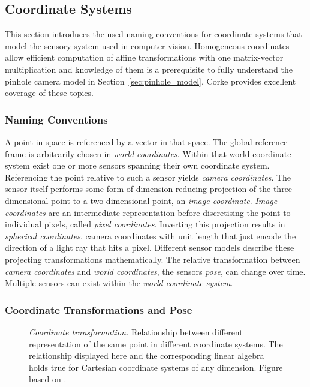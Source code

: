 \subsection{Coordinate Systems}

This section introduces the used naming conventions for coordinate systems that model the sensory system used in computer vision.
Homogeneous coordinates allow efficient computation of affine transformations with one matrix-vector multiplication and knowledge of them is a prerequisite to fully understand the pinhole camera model in Section~\ref{sec:pinhole_model}.
Corke\cite[p. 15-39,533]{corke_2011} provides excellent coverage of these topics.

\subsubsection*{Naming Conventions}

A point in space is referenced by a vector in that space.
The global reference frame is arbitrarily chosen in \emph{world coordinates}.
Within that world coordinate system exist one or more sensors spanning their own coordinate system.
Referencing the point relative to such a sensor yields \emph{camera coordinates}.
The sensor itself performs some form of dimension reducing projection of the three dimensional point to a two dimensional point, an \emph{image coordinate}\cite[p. 251-261]{corke_2011}.
\emph{Image coordinates} are an intermediate representation before discretising the point to individual pixels, called \emph{pixel coordinates}.
Inverting this projection results in \emph{spherical coordinates}, camera coordinates with unit length that just encode the direction of a light ray that hits a pixel.
Different sensor models describe these projecting transformations mathematically.
The relative transformation between \emph{camera coordinates} and \emph{world coordinates}, the sensors \emph{pose}, can change over time.
Multiple sensors can exist within the \emph{world coordinate system}.

\subsubsection*{Coordinate Transformations and Pose}

\begin{figure}[tb!]
    \scalebox{0.7}{%
    
    }
    \caption[Coordinate transformation]{\emph{Coordinate transformation.} Relationship between different representation of the same point in different coordinate systems. The relationship displayed here and the corresponding linear algebra holds true for Cartesian coordinate systems of any dimension. Figure based on \cite[p.20]{corke_2011}.}\label{fig:coordinate_transformation}
\end{figure}

